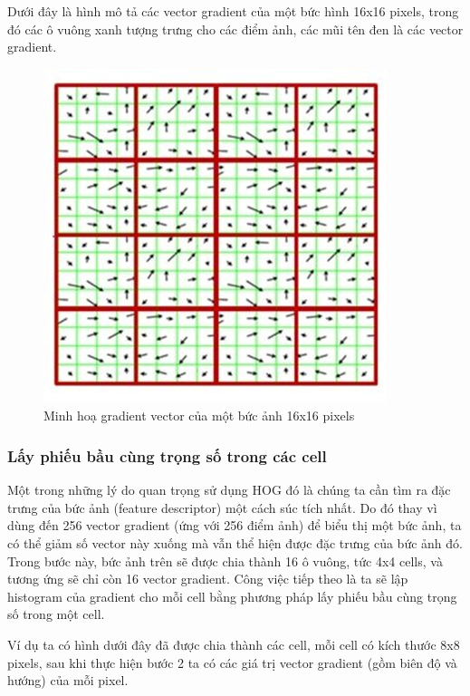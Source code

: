 \documentclass[10pt,conference,a4paper]{IEEEtran}
\makeatletter
\def\ScaleIfNeeded{\ifdim\Gin@nat@width>\linewidth\linewidth\else\Gin@nat@width\fi}
\makeatother
\begin{document}
Dưới đây là hình mô tả các vector gradient của một bức hình 16x16 pixels, trong đó các ô vuông xanh tượng trưng cho các điểm ảnh, các mũi tên đen là các vector gradient.
  
\begin{figure}[!htp]
	\centering
	\includegraphics[width=\ScaleIfNeeded]{"gradient vector"}
	\caption{Minh hoạ gradient vector của một bức ảnh 16x16 pixels}
	\label{fig:gradient-vector}
\end{figure}

\subsubsection{Lấy phiếu bầu cùng trọng số trong các cell}
Một trong những lý do quan trọng sử dụng HOG đó là chúng ta cần tìm ra đặc trưng của bức ảnh (feature descriptor) một cách súc tích nhất. Do đó thay vì dùng đến 256 vector gradient (ứng với 256 điểm ảnh) để biểu thị một bức ảnh, ta có thể giảm số vector này xuống mà vẫn thể hiện được đặc trưng của bức ảnh đó. Trong bước  này, bức ảnh trên sẽ được chia thành 16 ô vuông, tức 4x4 cells, và tương ứng sẽ chỉ còn 16 vector gradient.
Công việc tiếp theo là ta sẽ lập histogram của gradient cho mỗi cell bằng phương pháp lấy phiếu bầu cùng trọng số trong một cell.

Ví dụ ta có hình dưới đây đã được chia thành các cell, mỗi cell có kích thước 8x8 pixels, sau khi thực hiện bước 2 ta có các giá trị vector gradient (gồm biên độ và hướng) của mỗi pixel.
\end{document}
